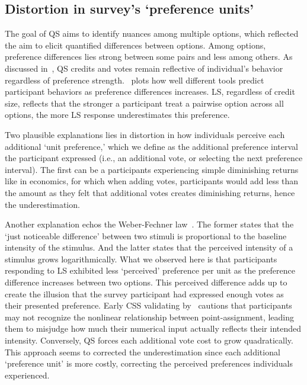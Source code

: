 \subsection{Distortion in survey's `preference units'}
The goal of QS aims to identify nuances among multiple options, which reflected the aim to elicit quantified differences between options. Among options, preference differences lies strong between some pairs and less among others. As discussed in~, QS credits and votes remain reflective of individual's behavior regardless of preference strength.~ plots how well different tools predict participant behaviors as preference differences increases. LS, regardless of credit size, reflects that the stronger a participant treat a pairwise option across all options, the more LS response underestimates this preference.

Two plausible explanations lies in distortion in how individuals perceive each additional `unit preference,' which we define as the additional preference interval the participant expressed (i.e., an additional vote, or selecting the next preference interval). The first can be a participants experiencing simple diminishing returns~\cite{mankiwPrinciplesEconomics2018} like in economics, for which when adding votes, participants would add less than the amount as they felt that additional votes creates diminishing returns, hence the underestimation. 

Another explanation echos the Weber-Fechner law~\cite{}. The former states that the `just noticeable difference' between two stimuli is proportional to the baseline intensity of the stimulus. And the latter states that the perceived intensity of a stimulus grows logarithmically. What we observed here is that participants responding to LS exhibited less `perceived' preference per unit as the preference difference increases between two options. This perceived difference adds up to create the illusion that the survey participant had expressed enough votes as their presented preference. Early CSS validating by~\citet{dudekValidityPointAssignmentProcedure1957} cautions that participants may not recognize the nonlinear relationship between point-assignment, leading them to misjudge how much their numerical input actually reflects their intended intensity. Conversely, QS forces each additional vote cost to grow quadratically. This approach seems to corrected the underestimation since each additional `preference unit' is more costly, correcting the perceived preferences individuals experienced.

